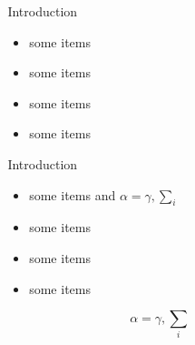 \documentclass[final]{beamer}
\begin{document}
\begin{frame}
\begin{columns}[t]
\begin{column}{.48\linewidth}
\end{column}
\begin{column}{.48\linewidth}
\begin{block}{Introduction}
\begin{itemize}
\item some items
\item some items
\item some items
\item some items
\end{itemize}
\end{block}

\begin{block}{Introduction}
\begin{itemize}
\item some items and $\alpha=\gamma, \sum_{i}$
\item some items
\item some items
\item some items
\end{itemize}
$$\alpha=\gamma, \sum_{i}$$
\end{block}

\end{column}
\end{columns}

\end{frame}
\end{document}
